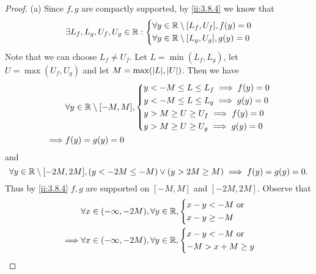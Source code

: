 \begin{proof}{(a)}
  Since \(f, g\) are compactly supported, by \cref{ii:3.8.4} we know that
  \[
    \exists L_f, L_g, U_f, U_g \in \mathbb{R} : \begin{dcases}
      \forall y \in \mathbb{R} \setminus [L_f, U_f], f(y) = 0 \\
      \forall y \in \mathbb{R} \setminus [L_g, U_g], g(y) = 0
    \end{dcases}
  \]
  Note that we can choose \(L_f \neq U_f\).
  Let \(L = \min(L_f, L_g)\), let \(U = \max(U_f, U_g)\) and let \(M = \max(\abs{L}, \abs{U})\).
  Then we have
  \begin{align*}
             & \forall y \in \mathbb{R} \setminus [-M, M], \begin{dcases}
                                                     y < -M \leq L \leq L_f \implies f(y) = 0 \\
                                                     y < -M \leq L \leq L_g \implies g(y) = 0 \\
                                                     y > M \geq U \geq U_f \implies f(y) = 0  \\
                                                     y > M \geq U \geq U_g \implies g(y) = 0
                                                   \end{dcases} \\
    \implies & f(y) = g(y) = 0
  \end{align*}
  and
  \[
    \forall y \in \mathbb{R} \setminus [-2M, 2M], (y < -2M \leq -M) \lor (y > 2M \geq M) \implies f(y) = g(y) = 0.
  \]
  Thus by \cref{ii:3.8.4} \(f, g\) are supported on \([-M, M]\) and \([-2M, 2M]\).
  Observe that
  \begin{align*}
             & \forall x \in (-\infty, -2M), \forall y \in \R, \begin{dcases}
                                                                 x - y < -M \text{ or } \\
                                                                 x - y \geq -M
                                                               \end{dcases}                      \\
    \implies & \forall x \in (-\infty, -2M), \forall y \in \R, \begin{dcases}
                                                                 x - y < -M \text{ or } \\
                                                                 -M > x + M \geq y

\end{dcases}
\end{align*}
\end{proof}
